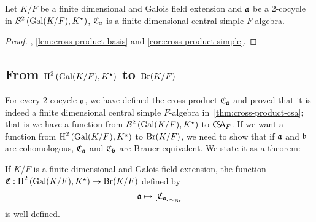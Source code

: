 \begin{theorem}\label{thm:cross-product-csa}
  Let $K/F$ be a finite dimensional and Galois field extension and $\mathfrak{a}$ be a 2-cocycle in $\mathcal{B}^{2}\left(\operatorname{Gal}(K/F), K^{\star}\right)$, $\operatorname{\mathfrak{C}}_{a}$ is a finite dimensional central simple $F$-algebra.
  \leanok
\end{theorem}
\begin{proof}
  , \cref{lem:cross-product-basis} and \cref{cor:cross-product-simple}.
\end{proof}

\subsection{From $\operatorname{H}^{2}\left(\operatorname{Gal}(K/F), K^{\star}\right)$ to $\operatorname{Br}(K/F)$}

For every 2-cocycle $\mathfrak{a}$, we have defined the cross product $\operatorname{\mathfrak{C}}_{\mathfrak{a}}$ and proved that it is indeed a finite dimensional central simple $F$-algebra in~\cref{thm:cross-product-csa}; that is we have a function from $\mathcal{B}^{2}\left(\operatorname{Gal}(K/F), K^{\star}\right)$ to $\operatorname{\mathsf{C}\!\mathsf{S}\!\mathsf{A}}_{F}$. If we want a function from $\operatorname{H}^{2}\left(\operatorname{Gal}(K/F), K^{\star}\right)$ to $\operatorname{Br}(K/F)$, we need to show that if $\mathfrak{a}$ and $\mathfrak{b}$ are cohomologous, $\operatorname{\mathfrak{C}}_{\mathfrak{a}}$ and $\operatorname{\mathfrak{C}}_{\mathfrak{b}}$ are Brauer equivalent. We state it as a theorem:

\begin{theorem}\label{thm:snd-coh-to-relative-br}
  If $K/F$ is a finite dimensional and Galois field extension,
  the function $\operatorname{\mathfrak{C}} : \operatorname{H}^{2}\left(\operatorname{Gal}(K/F), K^{\star}\right) \to \operatorname{Br}(K/F)$ defined by
  \[
    \mathfrak{a} \mapsto \left[\operatorname{\mathfrak{C}}_{\mathfrak{a}}\right]_{\sim_{\operatorname{Br}}}
  \]
  is well-defined.
  \leanok
\end{theorem}


